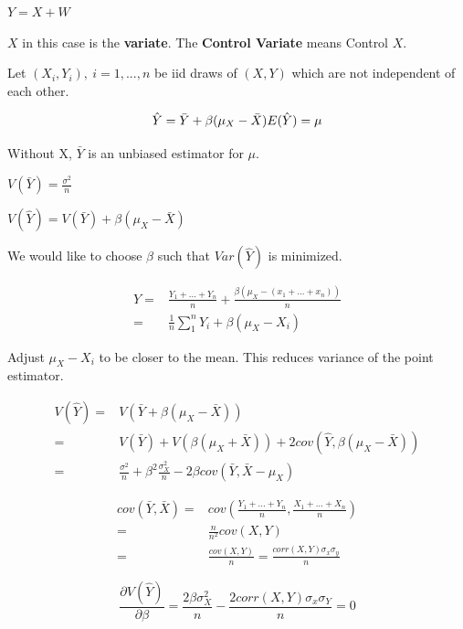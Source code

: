 \documentclass[11pt]{article}
\begin{document}
\(Y = X + W\)

\(X\) in this case is the \textbf{variate}. The \textbf{Control Variate} means Control \(X\).

Let \((X_i, Y_i), \ i = 1,...,n\) be iid draws of \((X, Y)\) which are not
independent of each other.

$$
\hat Y = \bar Y + \beta(\mu_X - \bar X)\\ E(\hat Y) = \mu
$$

Without X, \(\bar Y\) is an unbiased estimator for \(\mu\).

\(V(\bar Y) = \frac{\sigma^2}{n}\)

\(V(\hat Y) = V(\bar Y) + \beta(\mu_X - \bar X)\)

We would like to choose \(\beta\) such that \(Var(\hat Y)\) is minimized.


\begin{equation}
\begin{split}
\hat Y = & \frac{Y_1 + ... + Y_n}{n} + \frac{\beta (\mu_X - (x_1 + ... + x_n))}{n}\\
= & \frac{1}{n} \sum_{1}^{n} Y_i + \beta (\mu_X - X_i)
\end{split}
\end{equation}

Adjust \(\mu_X - X_i\) to be closer to the mean. This reduces variance of the
point estimator.


\begin{equation}
\begin{split}
V(\hat Y) = & V(\bar Y + \beta (\mu_X - \bar X))\\
= & V(\bar Y) + V(\beta (\mu_X + \bar X)) + 2 cov (\hat Y, \beta (\mu_X - \bar X))\\
= & \frac{\sigma^2}{n} + \beta^2 \frac{\sigma_X^2}{n} - 2 \beta cov(\bar Y, \bar X - \mu_X)
\end{split}
\end{equation}


\begin{equation}
\begin{split}
cov(\bar Y, \bar X) = & cov(\frac{Y_1 + ... + Y_n}{n}, \frac{X_1 + ... + X_n}{n})\\
= & \frac{n}{n^2} cov (X, Y)\\
= & \frac{cov(X, Y)}{n} = \frac{corr(X, Y) \sigma_x \sigma_y}{n}
\end{split}
\end{equation}

$$
\frac{\partial V(\hat Y)}{\partial \beta} = \frac{2 \beta \sigma_X^2}{n} -
\frac{2 corr(X, Y) \sigma_x \sigma_Y}{n} = 0
$$
\end{document}
